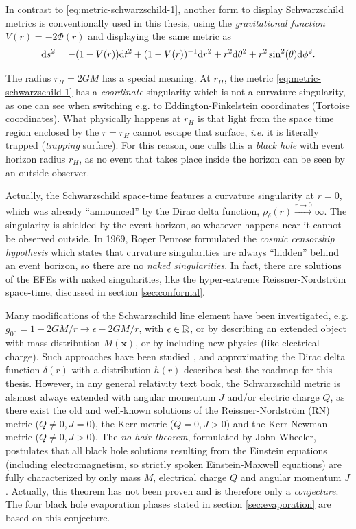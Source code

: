 \documentclass[12pt,a4paper]{report}
\numberwithin{equation}{chapter}
\begin{document}
In contrast to \eqref{eq:metric-schwarzschild-1}, another form to display Schwarzschild metrics is conventionally used in this thesis, using the \emph{gravitational function} $V(r)=-2\Phi(r)$ and displaying the same metric as
\begin{equation}\label{eq:metric-schwarzschild-b}
\mathrm{d} s^2 = - (1-V(r)) \mathrm{d} t^2 + (1-V(r))^{-1} \mathrm{d} r^2 + r^2\mathrm{d}\theta^2 + r^2\sin^2(\theta) \mathrm{d} \phi^2.
\end{equation}

The radius $r_H=2GM$ has a special meaning. At $r_H$, the metric \eqref{eq:metric-schwarzschild-1} has a \emph{coordinate} singularity which is not a curvature singularity, as one can see when switching e.g. to Eddington-Finkelstein coordinates (Tortoise coordinates). What physically happens at $r_H$ is that light from the space time region enclosed by the $r=r_H$ cannot escape that surface, \emph{i.e.} it is literally trapped (\emph{trapping} surface). For this reason, one calls this a \emph{black hole} with event horizon radius $r_H$, as no event that takes place inside the horizon can be seen by an outside observer.

Actually, the Schwarzschild space-time features a curvature singularity at $r=0$, which was already ``announced'' by the Dirac delta function, $\rho_\delta(r)\xrightarrow{r\to 0}\infty$. The singularity is shielded by the event horizon, so whatever happens near it cannot be observed outside. In 1969, Roger Penrose formulated the \emph{cosmic censorship hypothesis} which states that curvature singularities are always ``hidden'' behind an event horizon, so there are no \emph{naked singularities}. In fact, there are solutions of the EFEs with naked singularities, like the hyper-extreme Reissner-Nordström space-time, discussed in section \ref{sec:conformal}.

Many modifications of the Schwarzschild line element have been investigated, e.g. $g_{00} = 1-2GM/r \to \epsilon - 2GM/r$, with $\epsilon \in \mathbb{R}$, or by describing an extended object with mass distribution $M(\boldsymbol x)$, or by including new physics (like electrical charge). Such approaches have been studied \cite{griffiths2009exact}, and approximating the Dirac delta function $\delta(r)$ with a distribution $h(r)$ describes best the roadmap for this thesis. However, in any general relativity text book, the Schwarzschild metric is alsmost always extended with angular momentum $J$ and/or electric charge $Q$, as there exist the old and well-known solutions of the Reissner-Nordström (RN) metric ($Q\neq 0, J=0$), the Kerr metric ($Q=0, J>0$) and the Kerr-Newman metric ($Q\neq 0, J>0$). The \emph{no-hair theorem}, formulated by John Wheeler, postulates that all black hole solutions resulting from the Einstein equations (including electromagnetism, so strictly spoken Einstein-Maxwell equations) are fully characterized by only mass $M$, electrical charge $Q$ and angular momentum $J$. Actually, this theorem has not been proven and is therefore only a \emph{conjecture}. The four black hole evaporation phases stated in section \ref{sec:evaporation} are based on this conjecture.
\end{document}
